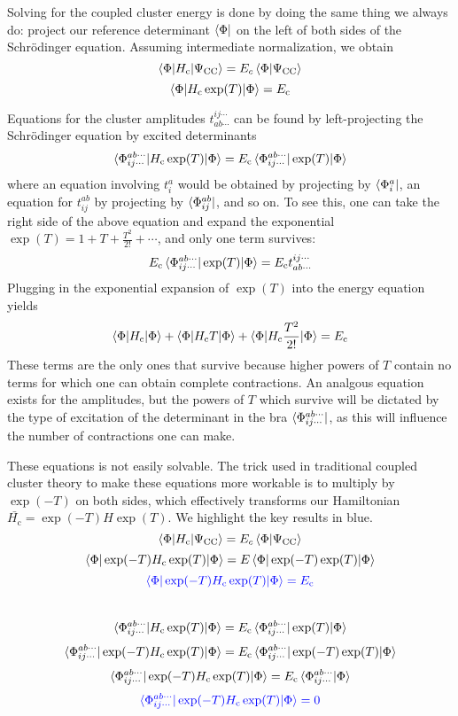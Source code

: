 \documentclass{article}
\newcommand{\Ec}{E_{\mathrm{c}}}
\newcommand{\Hc}{H_{\mathrm{c}}}
\begin{document}
Solving for the coupled cluster energy is done by doing the same thing we always do:
project our reference determinant $\bra{\Phi}$ on the left of both sides 
of the Schr{\"o}dinger equation.
Assuming intermediate normalization, we obtain
\[\braket{\Phi | \Hc | \Psi_{\mathrm{CC}}} = E_c \braket{\Phi|\Psi_{\mathrm{CC}}} \]
\[\braket{\Phi | \Hc \exp(T) | \Phi} = \Ec \]

Equations for the cluster amplitudes $t_{a b \cdots }^{i j \cdots}$
can be found by left-projecting the Schr{\"o}dinger equation by excited determinants
\[ \braket{ \Phi_{i j \cdots }^{a b \cdots} | \Hc \exp(T) | \Phi} = 
   \Ec \braket{\Phi_{i j \cdots }^{a b \cdots} | \exp(T) | \Phi} \]
where an equation involving $t_i^a$ would be obtained by projecting by $\bra{\Phi_{i}^{a}}$,
an equation for $t_{ij}^{ab}$ by projecting by $\bra{\Phi_{ij}^{ab}}$, and so on. 
To see this, one can take the right side of the above equation and expand the exponential $\exp(T) = 1 + T + \frac{T^2}{2!} + \cdots $, and only one term survives:
\[ \Ec \braket{\Phi_{i j \cdots }^{a b \cdots} | \exp(T) | \Phi} = \Ec t_{a b \cdots }^{i j \cdots}\]
Plugging in the exponential expansion of $\exp(T)$ into the energy equation
yields 
\[ \braket{\Phi | \Hc | \Phi} + \braket{\Phi| \Hc T| \Phi} + \braket{\Phi | \Hc \frac{T^2}{2!} | \Phi} = \Ec \]
These terms are the only ones that survive because higher powers of $T$ contain no terms for 
which one can obtain complete contractions. 
An analgous equation exists for the amplitudes, but the powers of $T$ which
survive will be dictated by the type of excitation of the determinant in the bra $\bra{\Phi_{i j \cdots }^{a b \cdots}}$, as this will influence the number of contractions one can make.

These equations is not easily solvable. The trick used in traditional coupled cluster 
theory to make these equations more workable is to multiply by $\exp(-T)$ on both sides,
which effectively transforms our Hamiltonian $\bar{\Hc} = \exp(-T) H \exp(T)$.
We highlight the key results in blue. 
\[\braket{\Phi | \Hc | \Psi_{\mathrm{CC}}} = E_c \braket{\Phi|\Psi_{\mathrm{CC}}} \]
\[ \braket{\Phi | \exp(-T) \Hc \exp(T) | \Phi } = E \braket{\Phi | \exp(-T) \exp(T) | \Phi} \]
\[ \color{blue} \braket{\Phi | \exp(-T) \Hc \exp(T) | \Phi } = \Ec \]
\quad
\\
\[ \braket{ \Phi_{i j \cdots }^{a b \cdots} | \Hc \exp(T) | \Phi} = 
    \Ec \braket{\Phi_{i j \cdots }^{a b \cdots} | \exp(T) | \Phi}  \]
\[ \braket{ \Phi_{i j \cdots }^{a b \cdots} | \exp(-T) \Hc \exp(T) | \Phi} = 
    \Ec \braket{\Phi_{i j \cdots }^{a b \cdots} | \exp(-T) \exp(T) | \Phi}  \]
\[ \braket{ \Phi_{i j \cdots }^{a b \cdots} | \exp(-T) \Hc \exp(T) | \Phi} = 
    \Ec \braket{\Phi_{i j \cdots }^{a b \cdots} | \Phi}  \]
\[ \color{blue} \braket{ \Phi_{i j \cdots }^{a b \cdots} | \exp(-T) \Hc \exp(T) | \Phi} 
   =  0  \]
\end{document}
